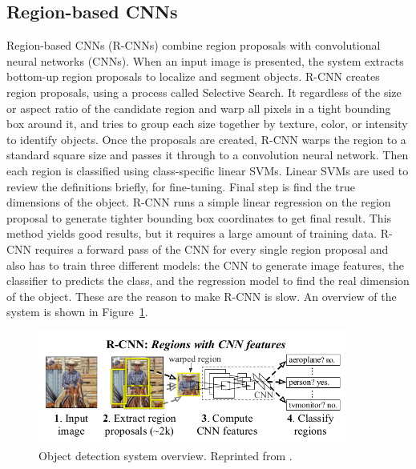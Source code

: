 \subsection{Region-based CNNs}
Region-based CNNs (R-CNNs) \cite{girshick2014rich} combine region proposals with convolutional neural networks (CNNs). When an input image is presented, the system extracts bottom-up region proposals to localize and segment objects. R-CNN creates region proposals, using a process called Selective Search. It regardless of the size or aspect ratio of the candidate region and warp all pixels in a tight bounding box around it, and tries to group each size together by texture, color, or intensity to identify objects. Once the proposals are created, R-CNN warps the region to a standard square size and passes it through to a convolution neural network.
Then each region is classified using class-specific linear SVMs. Linear SVMs are used to review the definitions briefly, for fine-tuning. Final step is find the true dimensions of the object. R-CNN runs a simple linear regression on the region proposal to generate tighter bounding box coordinates to get final result. This method yields good results, but it requires a large amount of training data. R-CNN requires a forward pass of the CNN for every single region proposal and also has to train three different models: the CNN to generate image features, the classifier to predicts the class, and the regression model to find the real dimension of the object. These are the reason to make R-CNN is slow. An overview of the system is shown in Figure~\ref{fig:rcnn}.

\begin{figure}[t]
  \centering
  \includegraphics[width=4in]{figures/rcnn.jpg}  
  \caption[R-CNNs]{Object detection system overview. Reprinted from . }
  \label{fig:rcnn}
\end{figure}

